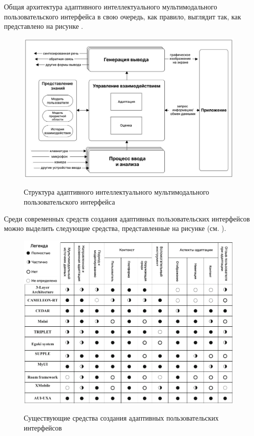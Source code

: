 Общая архитектура адаптивного интеллектуального мультимодального пользовательского интерфейса в свою очередь, как правило, выглядит так, как представлено на рисунке .

\begin{figure}[H]
	\centering
	\caption{Структура адаптивного интеллектуального мультимодального пользовательского интерфейса}
	\includegraphics[scale=0.4]{author/part4/figures/adaptive_ui.png}
	\label{fig:adaptive_ui}
\end{figure}

Среди современных средств создания адаптивных пользовательских интерфейсов можно выделить следующие средства, представленные на рисунке  (см. ).

\begin{figure}[H]
	\centering
	\caption{Существующие средства создания адаптивных пользовательских интерфейсов}
	\includegraphics[scale=0.4]{author/part4/figures/adaptive_ui_tools.png}
	\label{fig:adaptive_ui_tools}
\end{figure}

